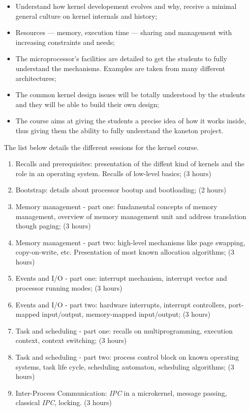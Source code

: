 \begin{multicols}{2}
\begin{itemize}
  \item
    Understand how kernel developement evolves and why, receive a
    minimal general culture on kernel internals and history;
  \item
    Resources --- memory, execution time --- sharing and management with
    increasing constraints and needs;
  \item
    The microprocessor's facilities are detailed to get the students
    to fully understand the mechanisms. Examples are taken from
    many different architectures;
  \item
    The common kernel design issues will be totally understood by the
    students and they will be able to build their own design;
  \item
    The course aims at giving the students a precise idea of how it
    works inside, thus giving them the ability to fully understand
    the kaneton project.
\end{itemize}

The list below details the different sessions for the kernel course.

\begin{enumerate}
  \item
    Recalls and prerequisites: presentation of the diffent kind of kernels
    and the role in an operating system. Recalls of low-level basics; (3 hours)
  \item
    Bootstrap: details about processor bootup and bootloading; (2 hours)
  \item
    Memory management - part one: fundamental concepts of memory management,
    overview of memory management unit and address translation though paging;
    (3 hours)
  \item
    Memory management - part two: high-level mechanisms like page swapping,
    copy-on-write, etc. Presentation of most known allocation algorithms;
    (3 hours)
  \item
    Events and I/O - part one: interrupt mechanism, interrupt vector and
    processor running modes; (3 hours)
  \item
    Events and I/O - part two: hardware interrupts, interrupt controllers,
    port-mapped input/output, memory-mapped input/output; (3 hours)
  \item
    Task and scheduling - part one: recalls on multiprogramming, execution
    context, context switching; (3 hours)
  \item
    Task and scheduling - part two: process control block on known operating
    systems, task life cycle, scheduling automaton, scheduling algorithms;
    (3 hours)
  \item
    Inter-Process Communication: \textit{IPC} in a microkernel, message
    passing, classical \textit{IPC}, locking. (3 hours)
\end{enumerate}


\end{multicols}

